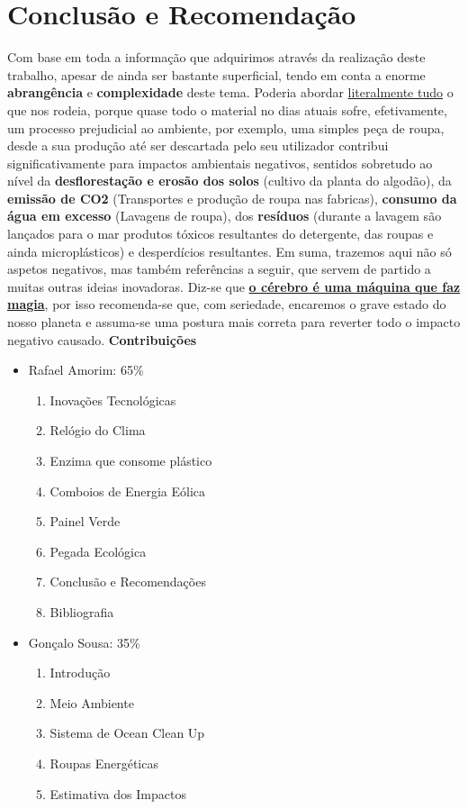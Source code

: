 \documentclass[letterpaper,12pt]{article}
\begin{document}
\section{Conclusão e Recomendação}
Com base em toda a informação que adquirimos através da realização deste trabalho, apesar de ainda ser bastante superficial, tendo em conta a enorme {\bf abrangência} e {\bf complexidade} deste tema. Poderia abordar \underline{literalmente tudo} o que nos rodeia, porque quase todo o material no dias atuais sofre, efetivamente, um processo prejudicial ao ambiente, por exemplo, uma simples peça de roupa, desde a sua produção até ser descartada pelo seu utilizador contribui significativamente para impactos ambientais negativos, sentidos sobretudo ao nível da {\bf desflorestação e erosão dos solos} (cultivo da planta do algodão), da {\bf emissão de CO2} (Transportes e produção de roupa nas fabricas), {\bf consumo da água em excesso} (Lavagens de roupa), dos {\bf resíduos} (durante a lavagem são lançados para o mar produtos tóxicos resultantes do detergente, das roupas e ainda microplásticos) e desperdícios resultantes.
Em suma, trazemos aqui não só aspetos negativos, mas também referências a seguir, que servem de partido a muitas outras ideias inovadoras. Diz-se que {\bf \underline{o cérebro é uma máquina que faz magia}}, por isso recomenda-se que, com seriedade, encaremos o grave estado do nosso planeta e assuma-se uma postura mais correta para reverter todo o impacto negativo causado.
\newpage
\Large{\bf Contribuições}
\begin{itemize}
    \item Rafael Amorim: 65\%
    \begin{enumerate}
        \item Inovações Tecnológicas
        \item Relógio do Clima
        \item Enzima que consome plástico
        \item Comboios de Energia Eólica
        \item Painel Verde
        \item Pegada Ecológica
        \item Conclusão e Recomendações
        \item Bibliografia
    \end{enumerate}
    \item Gonçalo Sousa: 35\%
    \begin{enumerate}
        \item Introdução
        \item Meio Ambiente
        \item Sistema de Ocean Clean Up
        \item Roupas Energéticas
        \item Estimativa dos Impactos
    \end{enumerate}
\end{itemize}



\end{document}
